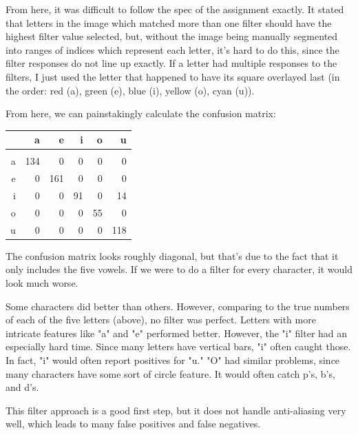 \documentclass{article}
\begin{document}
From here, it was difficult to follow the spec of the assignment exactly. It 
stated that letters in the image which matched more than one filter should have 
the highest filter value selected, but, without the image being manually 
segmented into ranges of indices which represent each letter, it's hard to do 
this, since the filter responses do not line up exactly. If a letter had multiple 
responses to the filters, I just used the letter that happened to have its square 
overlayed last (in the order: red (a), green (e), blue (i), yellow (o), cyan (u)).

From here, we can painstakingly calculate the confusion matrix:

\begin{tabular}{r | r r r r r}
      &   a &   e &  i &  o &   u \\
    \hline                        \\
    a & 134 &   0 &  0 &  0 &   0 \\
    e &   0 & 161 &  0 &  0 &   0 \\
    i &   0 &   0 & 91 &  0 &  14 \\
    o &   0 &   0 &  0 & 55 &   0 \\
    u &   0 &   0 &  0 &  0 & 118
\end{tabular}

The confusion matrix looks roughly diagonal, but that's due to the fact that it 
only includes the five vowels. If we were to do a filter for every character, it 
would look much worse.

Some characters did better than others. However, comparing to the true numbers of 
each of the five letters (above), no filter was perfect. Letters with more 
intricate features like "a" and "e" performed better. However, the "i" filter had an 
especially hard time. Since many letters have vertical bars, "i" often caught those. 
In fact, "i" would often report positives for "u." "O" had similar problems, since 
many characters have some sort of circle feature. It would often catch p's, b's, 
and d's.

This filter approach is a good first step, but it does not handle anti-aliasing 
very well, which leads to many false positives and false negatives.
\end{document}
